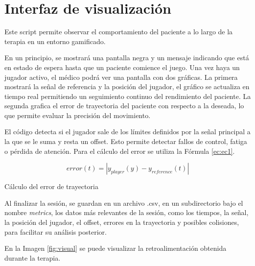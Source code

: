 \section{Interfaz de visualización}

Este script permite observar el comportamiento del paciente a lo largo de la terapia en un entorno gamificado.

En un principio, se mostrará una pantalla negra y un mensaje indicando que está en estado de espera hasta que un paciente comience el juego.
Una vez haya un jugador activo, el médico podrá ver una pantalla con dos gráficas.
La primera mostrará la señal de referencia y la posición del jugador, el gráfico se actualiza en tiempo real permitiendo un seguimiento continuo del rendimiento del paciente.
La segunda grafica el error de trayectoria del paciente con respecto a la deseada, lo que permite evaluar la precisión del movimiento.

El código detecta si el jugador sale de los límites definidos por la señal principal a la que se le suma y resta un offset.
Esto permite detectar fallos de control, fatiga o pérdida de atención.
Para el cálculo del error se utiliza la Fórmula \ref{ec:ec1}.

\begin{myequation}[h]
\begin{equation}
error(t) = | y_{player}(y) - y_{reference}(t) |
\nonumber
\label{ec:ec1}
\end{equation}
\caption[Cálculo del error de trayectoria]{Cálculo del error de trayectoria}
\end{myequation} 

Al finalizar la sesión, se guardan en un archivo .csv, en un subdirectorio bajo el nombre \textit{metrics}, los datos más relevantes de la sesión, como los tiempos, la señal, la posición del jugador, el offset, errores en la trayectoria y posibles colisiones, para facilitar su análisis posterior.

En la Imagen \ref{fig:visual} se puede visualizar la retroalimentación obtenida durante la terapia.

